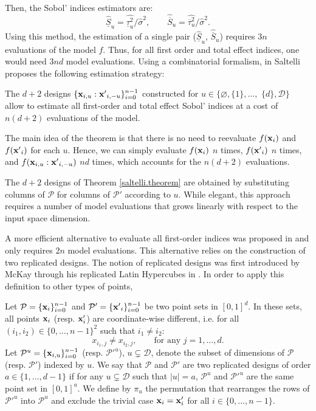 Then, the Sobol' indices estimators are:
\begin{equation}
\widehat{\underline{S}}_u = \widehat{\underline{\tau}_u^2} / \widehat{\sigma}^2, \qquad
\widehat{\overline{S}}_u = \widehat{\overline{\tau}_u^2} / \widehat{\sigma}^2.
\label{common.sobol.est}
\end{equation}
Using this method, the estimation of a single pair ($\widehat{\underline{S}}_u$, $\widehat{\overline{S}}_u$) requires $3n$ evaluations of the model $f$. Thus, for all first order and total effect indices, one would need $3nd$ model evaluations. Using a combinatorial formalism, in \cite{Saltelli} Saltelli proposes the following estimation strategy:
\begin{theorem}
\label{saltelli.theorem}
The $d+2$ designs $\{\boldsymbol{\mathbf{x}}_{i,u}:{\boldsymbol{\mathbf{x}}'}_{i,-u}\}_{i=0}^{n-1}$ constructed for $u \in \{\varnothing,\{1\},\dots,$ $\{d\},\mathcal{D}\}$ allow to estimate all first-order and total effect Sobol' indices at a cost of $n(d+2)$ evaluations of the model.
\end{theorem}
The main idea of the theorem is that there is no need to reevaluate $f({\boldsymbol{\mathbf{x}}}_i)$ and $f({\boldsymbol{\mathbf{x}}'}_i)$ for each $u$. Hence, we can simply evaluate $f({\boldsymbol{\mathbf{x}}}_i)$ $n$ times, $f({\boldsymbol{\mathbf{x}}'}_i)$ $n$ times, and $f(\boldsymbol{\mathbf{x}}_{i,u}:{\boldsymbol{\mathbf{x}}'}_{i,-u})$ $nd$ times, which accounts for the $n(d+2)$ evaluations.

The $d+2$ designs of Theorem \ref{saltelli.theorem} are obtained by substituting columns of $\mathcal{P}$ for columns of $\mathcal{P}'$ according to $u$. While elegant, this approach requires a number of model evaluations that grows linearly with respect to the input \break space dimension.

A more efficient alternative to evaluate all first-order indices was proposed in \cite{Mara} and only requires $2n$ model evaluations. This alternative relies on the construction of two replicated designs. The notion of replicated designs was first introduced by McKay through his replicated Latin Hypercubes in \cite{McKay}. In order to apply this definition to other types of points, 

\begin{definition}
\label{rep.designs}
Let $\mathcal{P}=\{\boldsymbol{\mathbf{x}}_i\}_{i=0}^{n-1}$ and $\mathcal{P}'=\{{\boldsymbol{\mathbf{x}}'}_i\}_{i=0}^{n-1}$ be two point sets in $[0,1]^{d}$. In these sets, all points $\boldsymbol{\mathbf{x}}_i$ (resp. $\boldsymbol{\mathbf{x}}'_i$) are coordinate-wise different, i.e. for all $(i_1,i_2) \in \{0,\dots,n-1\}^2$ such that $i_1 \neq i_2$: $$x_{i_1,j} \neq x_{i_2,j}, \qquad \text{for any  } j=1,\dots,d .$$
Let $\mathcal{P}^u=\{\boldsymbol{\mathbf{x}}_{i,u}\}_{i=0}^{n-1}$ (resp. ${\mathcal{P}'}^u$), $u \subsetneq \mathcal{D}$, denote the subset of dimensions of $\mathcal{P}$ (resp. $\mathcal{P}'$) indexed by $u$. We say that $\mathcal{P}$ and $\mathcal{P}'$ are two replicated designs of order $a \in \{1,\dots,d-1\}$ if for any $u \subsetneq \mathcal{D}$ such that $|u|=a$, $\mathcal{P}^u$ and ${\mathcal{P}'}^u$ are the same point set in $[0,1]^a$. We define by $\pi_u$ the permutation that rearranges the rows of ${\mathcal{P}'}^u$ into $\mathcal{P}^u$ and exclude the trivial case $\boldsymbol{\mathbf{x}}_i = \boldsymbol{\mathbf{x}}'_i$ for all $i\in\{0,\dots,n-1\}$.
\end{definition}

